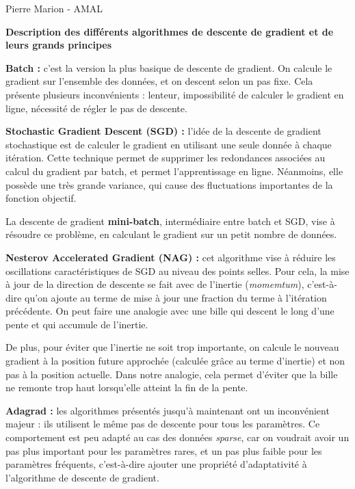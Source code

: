 \documentclass[12 pt, a4paper]{article}
\theoremstyle{definition}
\begin{document}
Pierre Marion - AMAL

\begin{center}
\textbf{Description des différents algorithmes de descente de gradient et de leurs grands principes}
\end{center}

\textbf{Batch :} c'est la version la plus basique de descente de gradient. On calcule le gradient sur l'ensemble des données, et on descent selon un pas fixe. Cela présente plusieurs inconvénients : lenteur, impossibilité de calculer le gradient en ligne, nécessité de régler le pas de descente.

\vspace{0.5cm}

\textbf{Stochastic Gradient Descent (SGD) :} l'idée de la descente de gradient stochastique est de calculer le gradient en utilisant une seule donnée à chaque itération. Cette technique permet de supprimer les redondances associées au calcul du gradient par batch, et permet l'apprentissage en ligne. Néanmoins, elle possède une très grande variance, qui cause des fluctuations importantes de la fonction objectif. 

La descente de gradient \textbf{mini-batch}, intermédiaire entre batch et SGD, vise à résoudre ce problème, en calculant le gradient sur un petit nombre de données.

\vspace{0.5cm}

\textbf{Nesterov Accelerated Gradient (NAG) :} cet algorithme vise à réduire les oscillations caractéristiques de SGD au niveau des points selles. Pour cela, la mise à jour de la direction de descente se fait avec de l'inertie (\textit{momemtum}), c'est-à-dire qu'on ajoute au terme de mise à jour une fraction du terme à l'itération précédente. On peut faire une analogie avec une bille qui descent le long d'une pente et qui accumule de l'inertie.

De plus, pour éviter que l'inertie ne soit trop importante, on calcule le nouveau gradient à la position future approchée (calculée grâce au terme d'inertie) et non pas à la position actuelle. Dans notre analogie, cela permet d'éviter que la bille ne remonte trop haut lorsqu'elle atteint la fin de la pente.

\vspace{0.5cm}

\textbf{Adagrad :} les algorithmes présentés jusqu'à maintenant ont un inconvénient majeur : ils utilisent le même pas de descente pour tous les paramètres. Ce comportement est peu adapté au cas des données \textit{sparse}, car on voudrait avoir un pas plus important pour les paramètres rares, et un pas plus faible pour les paramètres fréquents, c'est-à-dire ajouter une propriété d'adaptativité à l'algorithme de descente de gradient.
\end{document}
